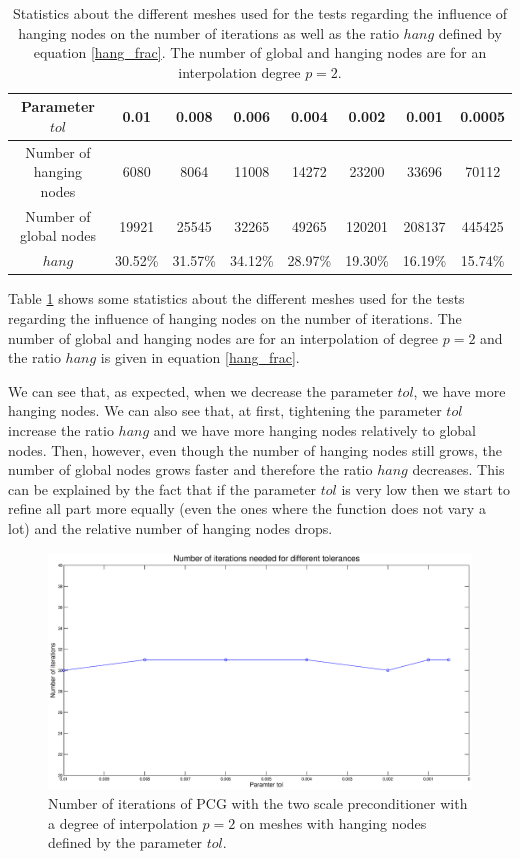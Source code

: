 \begin{table}
\centering
\begin{tabular}{c|ccccccc}
Parameter $tol$ & 0.01 & 0.008 & 0.006 & 0.004 & 0.002 & 0.001 & 0.0005\\
\hline
Number of hanging nodes & 6080 & 8064 & 11008 & 14272 & 23200 & 33696 & 70112\\
Number of global nodes & 19921 & 25545 & 32265 & 49265 & 120201 & 208137 & 445425\\
$hang$ & 30.52\% & 31.57\% & 34.12\% & 28.97\% & 19.30\% & 16.19\% & 15.74\%
\end{tabular}
\caption{Statistics about the different meshes used for the tests regarding the influence of hanging nodes on the number of iterations as well as the ratio $hang$ defined by equation \ref{hang_frac}. The number of global and hanging nodes are for an interpolation degree $p=2$.}
\label{two_hang_table}
\end{table}

Table \ref{two_hang_table} shows some statistics about the different meshes used for the tests regarding the influence of hanging nodes on the number of iterations. The number of global and hanging nodes are for an interpolation of degree $p=2$ and the ratio $hang$ is given in equation \ref{hang_frac}.

We can see that, as expected, when we decrease the parameter $tol$, we have more hanging nodes. We can also see that, at first, tightening the parameter $tol$ increase the ratio $hang$ and we have more hanging nodes relatively to global nodes. Then, however, even though the number of hanging nodes still grows, the number of global nodes grows faster and therefore the ratio $hang$ decreases. This can be explained by the fact that if the parameter $tol$ is very low then we start to refine all part more equally (even the ones where the function does not vary a lot) and the relative number of hanging nodes drops. 

\begin{figure}
\centering
\includegraphics[scale=0.35]{Results/two_hang_iter.eps}
\caption{Number of iterations of PCG with the two scale preconditioner with a degree of interpolation $p=2$ on meshes with hanging nodes defined by the parameter $tol$.}
\label{two_hang_iter}
\end{figure}


